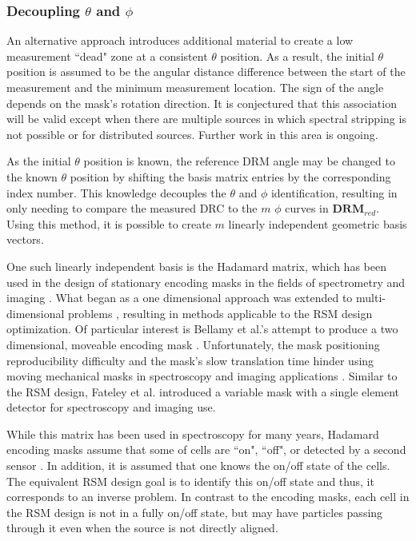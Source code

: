 \documentclass[3p,times]{elsarticle}
\begin{document}
\subsubsection{Decoupling $\theta$ and $\phi$}
\label{sec:decoupling}
An alternative approach introduces additional material to create a low measurement ``dead" zone at a consistent $\theta$ position.  
As a result, the initial $\theta$ position is assumed to be the angular distance difference between the start of the measurement and the minimum measurement location.  
The sign of the angle depends on the mask's rotation direction.  
It is conjectured that this association will be valid except when there are multiple sources in which spectral stripping is not possible or for distributed sources.  
Further work in this area is ongoing.

As the initial $\theta$ position is known, the reference DRM angle may be changed to the known $\theta$ position by shifting the basis matrix entries by the corresponding index number.
This knowledge decouples the $\theta$ and $\phi$ identification, resulting in only needing to compare the measured DRC to the $m$ $\phi$ curves in $\mathbf{DRM}_{red}$.  
Using this method, it is possible to create $m$ linearly independent geometric basis vectors.

One such linearly independent basis is the Hadamard matrix, which has been used in the design of stationary encoding masks in the fields of spectrometry and imaging \cite{Sloane76, Dyer91, Finger85}. 
What began as a one dimensional approach was extended to multi-dimensional problems \cite{Hammaker95, Hanley00, DeVerse00}, resulting in methods applicable to the RSM design optimization.
Of particular interest is Bellamy et al.'s attempt to produce a two dimensional, moveable encoding mask \cite{Bellamy97}.  Unfortunately, the mask positioning reproducibility difficulty and the mask's slow translation time hinder using moving mechanical masks in spectroscopy and imaging applications \cite{DeVerse00}.
Similar to the RSM design, Fateley et al. \cite{Fateley02} introduced a variable mask with a single element detector for spectroscopy and imaging use.  

While this matrix has been used in spectroscopy for many years, Hadamard encoding masks assume that some of cells are ``on", ``off", or detected by a second sensor \cite{DeVerse00}.  
In addition, it is assumed that one knows the on/off state of the cells.  
The equivalent RSM design goal is to identify this on/off state and thus, it corresponds to an inverse problem.  
In contrast to the encoding masks, each cell in the RSM design is not in a fully on/off state, but may have particles passing through it even when the source is not directly aligned.
\end{document}
